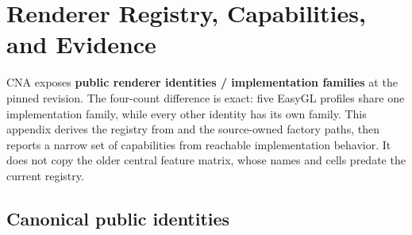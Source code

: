 \chapter{Renderer Registry, Capabilities, and Evidence}
\label{ch:feature-matrix}

CNA exposes \textbf{\RendererIdentityCount{} public renderer identities /
\RendererFamilyCount{} implementation families} at the pinned
revision.  The four-count difference is exact: five EasyGL profiles share one implementation
family, while every other identity has its own family.  This appendix derives the registry from
 and the source-owned factory paths, then reports a narrow set of
capabilities from reachable implementation behavior.  It does not copy the older central feature
matrix, whose names and cells predate the current registry.


\section{Canonical public identities}

